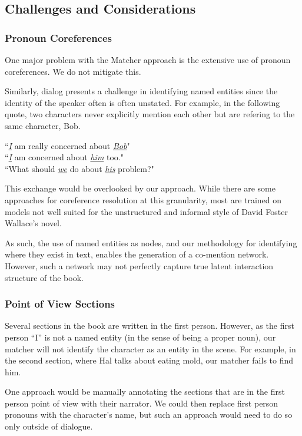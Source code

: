\subsection{Challenges and Considerations}

\subsubsection{Pronoun Coreferences}
One major problem with the Matcher approach is the extensive use of pronoun coreferences. We do not mitigate this.

Similarly, dialog presents a challenge in identifying named entities since the identity of the speaker often is often unstated. For example, in the following quote, two characters never explicitly mention each other but are refering to the same character, Bob.

\begin{displayquote}
``\emph{\underline{I}} am really concerned about \emph{\underline{Bob}}"\\
``\emph{\underline{I}} am concerned about \emph{\underline{him}} too."\\
``What should \underline{\emph{we}} do about \underline{\emph{his}} problem?"
\end{displayquote}

This exchange would be overlooked by our approach. While there are some approaches for coreference resolution at this granularity, most are trained on models not well suited for the unstructured and informal style of David Foster Wallace's novel. 

As such, the use of named entities as nodes, and our methodology for identifying where they exist in text, enables the generation of a co-mention network. However, such a network may not perfectly capture true latent interaction structure of the book.

\subsubsection{Point of View Sections}
Several sections in the book are written in the first person. However, as the first person ``I'' is not a named entity (in the sense of being a proper noun), our matcher will not identify the character as an entity in the scene. For example, in the second section, where Hal talks about eating mold, our matcher fails to find him.

One approach would be manually annotating the sections that are in the first person point of view with their narrator. We could then replace first person pronouns with the character's name, but such an approach would need to do so only outside of dialogue.

